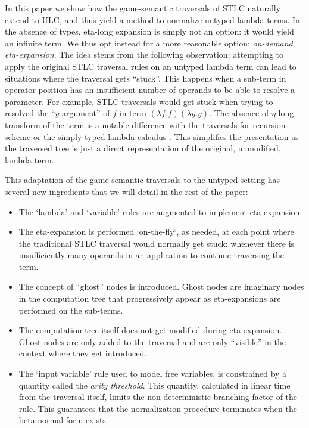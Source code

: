\documentclass{article}
\theoremstyle{definition}
\begin{document}
In this paper we show how the game-semantic traversals of STLC \cite{BlumPhd} naturally extend to ULC, and thus yield a method to normalize untyped lambda terms. In the absence of types, eta-long expansion is simply not an option: it would yield an infinite term. We thus opt instead for a more reasonable option: \emph{on-demand eta-expansion}. The idea stems from the following observation: attempting to apply the original STLC traversal rules on an untyped lambda term can lead to situations where the traversal gets ``stuck''. This happens when a sub-term in operator position has an insufficient number of operands to be able to resolve a parameter. For example, STLC traversals would get stuck when trying to resolved the ``$y$ argument'' of $f$ in term $(\lambda f.f)(\lambda y.y)$. The absence of $\eta$-long transform of the term is a notable difference with the traversals for recursion scheme \cite{Ong2006} or the simply-typed lambda calculus \cite{BlumPhd}. This simplifies the presentation as the traversed tree is just a direct representation of the original, unmodified, lambda term.

This adaptation of the game-semantic traversals to the untyped setting has several new ingredients that we will detail in the rest of the paper:
\begin{itemize}
\item  The `lambda' and `variable' rules are augmented to implement eta-expansion.
 \item The eta-expansion is performed `on-the-fly`, as needed, at each point where the traditional STLC traversal would normally get stuck: whenever there is insufficiently many operands in an application to continue traversing the term.
\item The concept of ``ghost'' nodes is introduced. Ghost nodes are imaginary nodes in the computation tree that progressively appear as eta-expansions are performed on the sub-terms.
\item The computation tree itself does not get modified during eta-expansion. Ghost nodes are only added to the traversal and are only ``visible'' in the context where they get introduced.
\item The `input variable' rule used to model free variables, is constrained by a quantity called the \emph{arity threshold}. This quantity, calculated in linear time from the traversal itself, limits the non-deterministic branching factor of the rule. This guarantees that the normalization procedure terminates when the beta-normal form exists.
\end{itemize}
\end{document}
